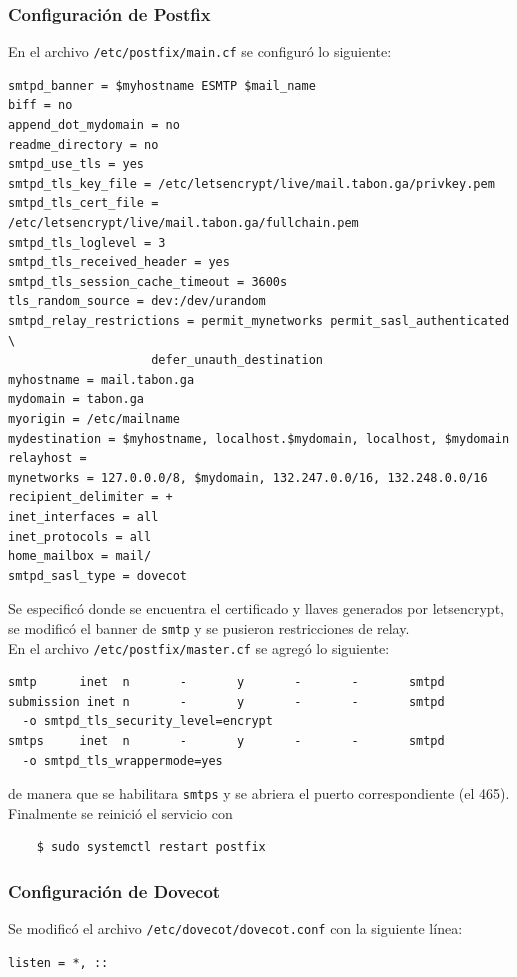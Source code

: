 \documentclass[9pt]{article}
\begin{document}
\subsubsection*{Configuración de Postfix}
En el archivo \texttt{/etc/postfix/main.cf} se configuró lo siguiente:
\begin{verbatim}
smtpd_banner = $myhostname ESMTP $mail_name         
biff = no
append_dot_mydomain = no
readme_directory = no
smtpd_use_tls = yes
smtpd_tls_key_file = /etc/letsencrypt/live/mail.tabon.ga/privkey.pem
smtpd_tls_cert_file = /etc/letsencrypt/live/mail.tabon.ga/fullchain.pem
smtpd_tls_loglevel = 3
smtpd_tls_received_header = yes
smtpd_tls_session_cache_timeout = 3600s
tls_random_source = dev:/dev/urandom
smtpd_relay_restrictions = permit_mynetworks permit_sasl_authenticated \
                    defer_unauth_destination
myhostname = mail.tabon.ga                              
mydomain = tabon.ga
myorigin = /etc/mailname
mydestination = $myhostname, localhost.$mydomain, localhost, $mydomain
relayhost = 
mynetworks = 127.0.0.0/8, $mydomain, 132.247.0.0/16, 132.248.0.0/16
recipient_delimiter = +
inet_interfaces = all
inet_protocols = all
home_mailbox = mail/
smtpd_sasl_type = dovecot
\end{verbatim}
Se especificó donde se encuentra el certificado y llaves generados por \textsf{letsencrypt}, se modificó el banner de \texttt{smtp} y se pusieron restricciones de relay. \\
En el archivo \texttt{/etc/postfix/master.cf} se agregó lo siguiente:
\begin{verbatim}
smtp      inet  n       -       y       -       -       smtpd
submission inet n       -       y       -       -       smtpd
  -o smtpd_tls_security_level=encrypt
smtps     inet  n       -       y       -       -       smtpd
  -o smtpd_tls_wrappermode=yes
\end{verbatim}
de manera que se habilitara \texttt{smtps} y se abriera el puerto correspondiente (el 465). Finalmente se reinició el servicio con
\begin{verbatim}
    $ sudo systemctl restart postfix
\end{verbatim}

\subsubsection*{Configuración de Dovecot}

Se modificó el archivo \texttt{/etc/dovecot/dovecot.conf} con la siguiente línea:
\begin{verbatim}
listen = *, ::
\end{verbatim}
\end{document}
